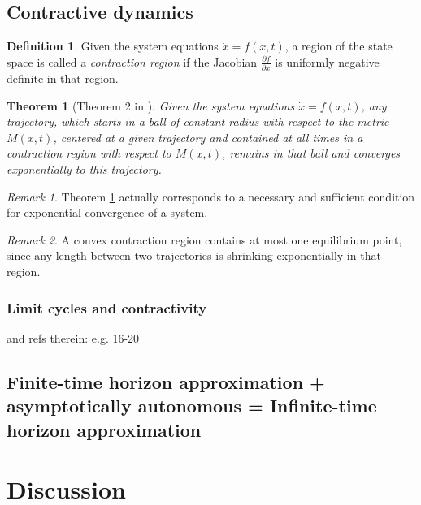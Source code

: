 \documentclass{article}
\newtheorem{theorem}{Theorem}
\theoremstyle{definition}
\newtheorem{definition}{Definition}
\theoremstyle{remark}
\newtheorem{remark}{Remark}
\newcounter{ct}
\begin{document}
\subsection{Contractive dynamics}
\begin{definition}
Given the system equations \(\dot{x} = f(x, t)\), a region of the state space is called a \textit{contraction region} if the Jacobian \(\frac{\partial f}{\partial x}\) is uniformly negative definite in that region.
\end{definition}

\begin{theorem}[Theorem 2 in \citep{lohmiller1998contraction}]\label{thrm:contractive}
Given the system equations $\dot x = f(x,t)$, any trajectory, which starts in a ball of constant radius with respect to the metric $M(x,t)$, centered at a given trajectory and contained at all times in a contraction region with respect to $M(x,t)$,  remains in that ball and converges exponentially to this trajectory.
\end{theorem}

\begin{remark}
Theorem \ref{thrm:contractive} actually corresponds to a necessary and sufficient condition for exponential convergence of a system. 
\end{remark}

\begin{remark}
A convex contraction region contains at most one equilibrium point, since any length between two trajectories is shrinking exponentially in that region.
\end{remark}


\subsubsection{Limit cycles and contractivity}
\citep{manchester2014transverse} and refs therein: e.g. 16-20



\subsection{Finite-time horizon approximation + asymptotically autonomous = Infinite-time horizon approximation}









\section{Discussion}
\end{document}
